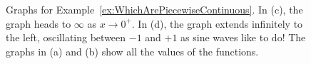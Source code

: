 \begin{figure}[htb]%
    \centering
{}%
\hspace{15pt}%
%
\newline
\centering
{}%
\hspace{5pt}%
%
    \caption[]{Graphs for Example~\ref{ex:WhichArePiecewiseContinuous}. In (c), the graph heads to $\infty$ as $x \to 0^+$. In (d), the graph extends infinitely to the left, oscillating between $-1$ and $+1$ as sine waves like to do! The graphs in (a) and (b) show all the values of the functions.}
    \label{fig:PiecewiseContinuity}
\end{figure}

